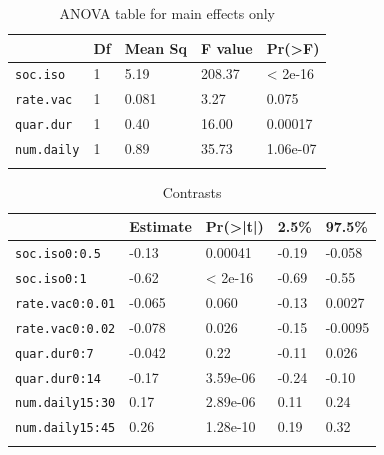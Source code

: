 \documentclass[12pt,a4paper]{article}
\begin{document}
\begin{appendices}
\begin{table}[H]
	\centering
	\begin{tabular}{l l l l l}\hline
		& Df & Mean Sq & F value &  Pr(>F)    \\\hline\hline
		\verb'soc.iso' & 1 &  5.19 & 208.37 & < 2e-16 \\\hline
		\verb'rate.vac' & 1 & 0.081 & 3.27 & 0.075 \\\hline
		\verb'quar.dur' & 1 & 0.40 & 16.00 & 0.00017 \\\hline
		\verb'num.daily' & 1 & 0.89 & 35.73 & 1.06e-07 \\\hline\\
	\end{tabular}
	\caption{ANOVA table for main effects only}
	\label{tab:anova}
\end{table}

\begin{table}[H]
	\centering
	\begin{tabular}{l l l l l}\hline
		& Estimate & Pr(>|t|) & 2.5\% & 97.5\%	\\\hline\hline
		\verb`soc.iso0:0.5` & -0.13 & 0.00041 & -0.19 & -0.058 \\\hline
		\verb`soc.iso0:1` & -0.62  & < 2e-16   &  -0.69  & -0.55 \\\hline
		\verb`rate.vac0:0.01` & -0.065  & 0.060 	& -0.13  & 0.0027\\\hline
		\verb`rate.vac0:0.02` & -0.078  &  0.026 	& -0.15 & -0.0095 \\\hline
		\verb`quar.dur0:7` &  -0.042  &  0.22  &  -0.11 & 0.026 \\\hline
		\verb`quar.dur0:14` &  -0.17  &  3.59e-06 	&  -0.24 & -0.10\\\hline
		\verb`num.daily15:30` &   0.17 &  2.89e-06 & 	0.11 & 0.24\\\hline
		\verb`num.daily15:45` &  0.26  &  1.28e-10 & 	0.19 & 0.32\\\hline\\
	\end{tabular}
	\caption{Contrasts}
	\label{tab:contrasts}
\end{table}



\end{appendices}
\end{document}

